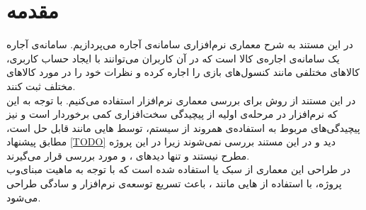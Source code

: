 \section*{مقدمه}
در این مستند به شرح معماری نرم‌افزاری سامانه‌ی آجاره می‌پردازیم. سامانه‌ی آجاره یک سامانه‌ی اجاره‌ی کالا است که در آن کاربران می‌توانند با ایجاد حساب کاربری، کالاهای مختلفی مانند کنسول‌های بازی را اجاره کرده و نظرات خود را در مورد کالاهای مختلف ثبت کنند. \\
در این مستند از روش 
برای بررسی معماری نرم‌افزار استفاده می‌کنیم. با توجه به این که نرم‌افزار در مرحله‌ی اولیه‌  از پیچیدگی سخت‌افزاری کمی برخوردار است و نیز  پیچیدگی‌های مربوط به استفاده‌ی همروند از سیستم، توسط 
‌هایی
مانند
قابل حل است، مطابق پیشنهاد
\ref{TODO} 
دید
و
در این مستند بررسی نمی‌شوند زیرا در این پروژه مطرح نیستند و تنها دید‌های
،
و
مورد بررسی قرار می‌گیرند.\\
در طراحی این معماری از سبک 
یا 
استفاده شده است که با توجه به ماهیت مبنای‌وب پروژه، با استفاده از ‌هایی مانند 
، 
باعث تسریع توسعه‌ی نرم‌افزار و سادگی طراحی می‌شود.\\